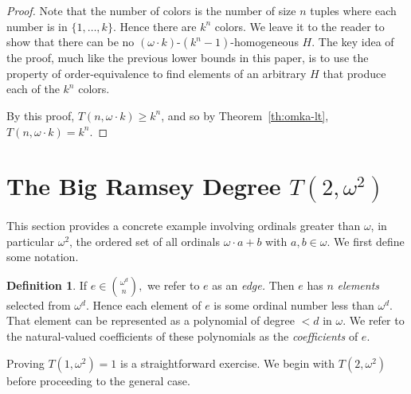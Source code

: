 \documentclass[10pt,a4paper]{article}
\newcommand{\om}{\omega}
\newcommand{\numpoints}{n}
\theoremstyle{plain}
\theoremstyle{definition}
\newtheorem{definition}[theorem]{Definition}
\begin{document}
\begin{proof}
Note that the number of colors is the number of size $\numpoints$ tuples where each 
number is in $\{1,\ldots,k\}$. Hence there are $k^{\numpoints}$ colors.
We leave it to the reader to show that there can be no $(\om \cdot k)$-$(k^{\numpoints}-1)$-homogeneous $H$. The key idea of the proof, much like the previous lower bounds in this paper, is to use the property of order-equivalence to find elements of an arbitrary $H$ that produce each of the $k^{\numpoints}$ colors.

By this proof, $T(\numpoints,\om \cdot k) \geq k^{\numpoints}$, and so by Theorem~\ref{th:omka-lt}, $T(\numpoints,\om \cdot k) = k^{\numpoints}$.

\end{proof}


\section{The Big Ramsey Degree \texorpdfstring{$T(2,\om^2)$}{T(2, omega 2)}}\label{se:omega2} 

This section provides a concrete example involving ordinals greater than $\om$, in particular $\om^2$, the ordered set of all ordinals $\om\cdot a +b$ with $a,b \in \om$. We first define some notation.
\begin{definition} \label{def:coef}
If $e \in \binom{\om^d}{n},$ we refer to $e$ as an {\it edge.} Then $e$ has $n$ {\it elements} selected from $\om^d.$
Hence each element of $e$ is some ordinal number less than $\om^d.$ That element can be represented as a polynomial of degree $< d$ in $\omega.$ We refer to the natural-valued coefficients of these polynomials as the {\it coefficients} of $e.$
\end{definition}

Proving $T(1, \om^2) = 1$ is a straightforward exercise. We begin with $T(2, \om^2)$ before proceeding to the general case.
\end{document}
